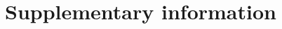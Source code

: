 \documentclass[twocolumn, empirical, authordate, issue]{jote-new-article}
\begin{document}
\newpage
\printbibliography



\onecolumn

\section{Supplementary information} 


\end{document}
